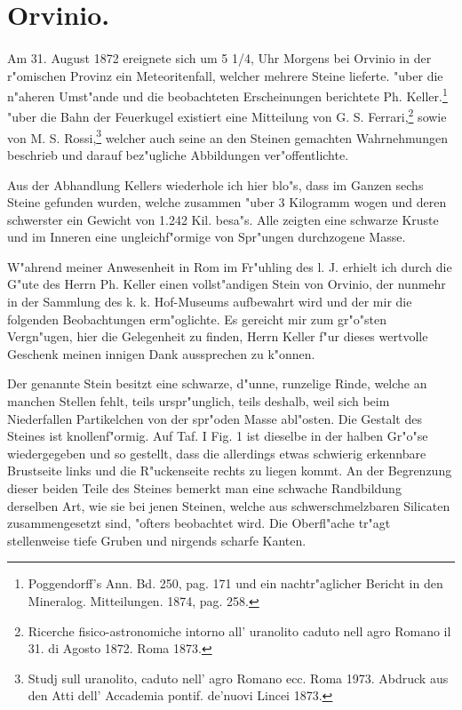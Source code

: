 \documentclass[a4paper, 11pt, oneside]{article}
\begin{document}
\section{Orvinio.}
\paragraph{}
Am 31. August 1872 ereignete sich um 5 1/4, Uhr Morgens bei Orvinio in der r"omischen Provinz ein Meteoritenfall, welcher mehrere Steine lieferte. "uber die n"aheren Umst"ande und die beobachteten Erscheinungen berichtete Ph. Keller.\footnote{Poggendorff's Ann. Bd. 250, pag. 171 und ein nachtr"aglicher Bericht in den Mineralog. Mitteilungen. 1874, pag. 258.} "uber die Bahn der Feuerkugel existiert eine Mitteilung von G. S. Ferrari,\footnote{Ricerche fisico-astronomiche intorno all' uranolito caduto nell agro Romano il 31. di Agosto 1872. Roma 1873.} sowie von M. S. Rossi,\footnote{Studj sull uranolito, caduto nell’ agro Romano ecc. Roma 1973. Abdruck aus den Atti dell’ Accademia pontif. de’nuovi Lincei 1873.} welcher auch seine an den Steinen gemachten Wahrnehmungen beschrieb und darauf bez"ugliche Abbildungen ver"offentlichte.

Aus der Abhandlung Kellers wiederhole ich hier blo"s, dass im Ganzen sechs Steine gefunden wurden, welche zusammen "uber 3 Kilogramm wogen und deren schwerster ein Gewicht von 1.242 Kil. besa"s. Alle zeigten eine schwarze Kruste und im Inneren eine ungleichf"ormige von Spr"ungen durchzogene Masse.

W"ahrend meiner Anwesenheit in Rom im Fr"uhling des l. J. erhielt ich durch die G"ute des Herrn Ph. Keller einen vollst"andigen Stein von Orvinio, der nunmehr in der Sammlung des k. k. Hof-Museums aufbewahrt wird und der mir die folgenden Beobachtungen erm"oglichte. Es gereicht mir zum gr"o"sten Vergn"ugen, hier die Gelegenheit zu finden, Herrn Keller f"ur dieses wertvolle Geschenk meinen innigen Dank aussprechen zu k"onnen.

Der genannte Stein besitzt eine schwarze, d"unne, runzelige Rinde, welche an manchen Stellen fehlt, teils urspr"unglich, teils deshalb, weil sich beim Niederfallen Partikelchen von der spr"oden Masse abl"osten. Die Gestalt des Steines ist knollenf"ormig. Auf Taf. I Fig. 1 ist dieselbe in der halben Gr"o"se wiedergegeben und so gestellt, dass die allerdings etwas schwierig erkennbare Brustseite links und die R"uckenseite rechts zu liegen kommt. An der Begrenzung dieser beiden Teile des Steines bemerkt man eine schwache Randbildung derselben Art, wie sie bei jenen Steinen, welche aus schwerschmelzbaren Silicaten zusammengesetzt sind, "ofters beobachtet wird. Die Oberfl"ache tr"agt stellenweise tiefe Gruben und nirgends scharfe Kanten.
\end{document}

